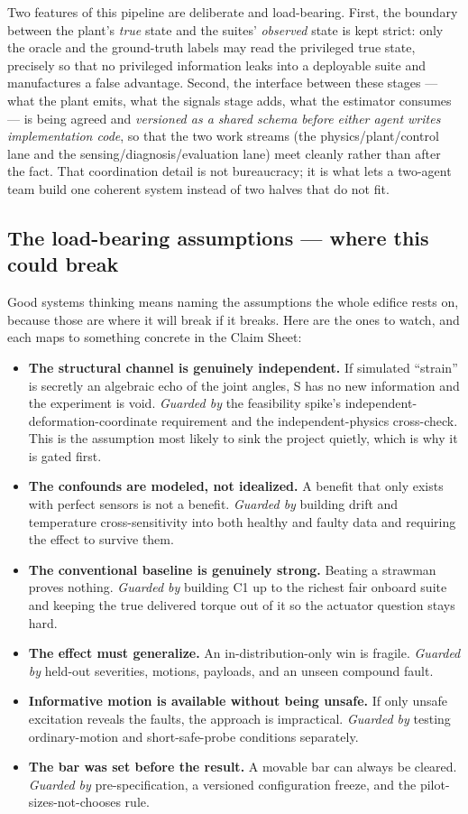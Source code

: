 \documentclass[12pt]{article}
\begin{document}
Two features of this pipeline are deliberate and load-bearing. First, the boundary between the plant's \emph{true} state and the suites' \emph{observed} state is kept strict: only the oracle and the ground-truth labels may read the privileged true state, precisely so that no privileged information leaks into a deployable suite and manufactures a false advantage. Second, the interface between these stages --- what the plant emits, what the signals stage adds, what the estimator consumes --- is being agreed and \emph{versioned as a shared schema before either agent writes implementation code}, so that the two work streams (the physics/plant/control lane and the sensing/diagnosis/evaluation lane) meet cleanly rather than after the fact. That coordination detail is not bureaucracy; it is what lets a two-agent team build one coherent system instead of two halves that do not fit.

\subsection{The load-bearing assumptions --- where this could break}

Good systems thinking means naming the assumptions the whole edifice rests on, because those are where it will break if it breaks. Here are the ones to watch, and each maps to something concrete in the Claim Sheet:

\begin{itemize}
  \item \textbf{The structural channel is genuinely independent.} If simulated ``strain'' is secretly an algebraic echo of the joint angles, S has no new information and the experiment is void. \emph{Guarded by} the feasibility spike's independent-deformation-coordinate requirement and the independent-physics cross-check. This is the assumption most likely to sink the project quietly, which is why it is gated first.
  \item \textbf{The confounds are modeled, not idealized.} A benefit that only exists with perfect sensors is not a benefit. \emph{Guarded by} building drift and temperature cross-sensitivity into both healthy and faulty data and requiring the effect to survive them.
  \item \textbf{The conventional baseline is genuinely strong.} Beating a strawman proves nothing. \emph{Guarded by} building C1 up to the richest fair onboard suite and keeping the true delivered torque out of it so the actuator question stays hard.
  \item \textbf{The effect must generalize.} An in-distribution-only win is fragile. \emph{Guarded by} held-out severities, motions, payloads, and an unseen compound fault.
  \item \textbf{Informative motion is available without being unsafe.} If only unsafe excitation reveals the faults, the approach is impractical. \emph{Guarded by} testing ordinary-motion and short-safe-probe conditions separately.
  \item \textbf{The bar was set before the result.} A movable bar can always be cleared. \emph{Guarded by} pre-specification, a versioned configuration freeze, and the pilot-sizes-not-chooses rule.
\end{itemize}
\end{document}
